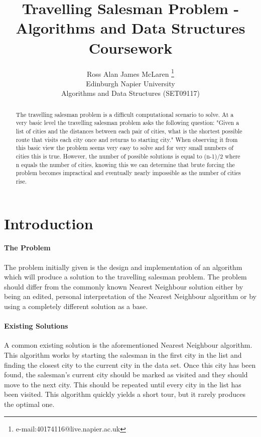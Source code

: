 \documentclass[conference,backref=page]{acmsiggraph}
\title{Travelling Salesman Problem - Algorithms and Data Structures Coursework}
\author{Ross Alan James McLaren \thanks{e-mail:40174116@live.napier.ac.uk} \\
Edinburgh Napier University\\
Algorithms and Data Structures (SET09117)}
\begin{document}
\maketitle

\raggedbottom

\begin{abstract}

The travelling salesman problem is a difficult computational scenario to solve. At a very basic level the travelling salesman problem asks the following question: "Given a list of cities and the distances between each pair of cities, what is the shortest possible route that visits each city once and returns to starting city." When observing it from this basic view the problem seems very easy to solve and for very small numbers of cities this is true. However, the number of possible solutions is equal to (n-1)/2 where n equals the number of cities, knowing this we 
can determine that brute forcing the problem becomes impractical and eventually nearly impossible as the number of cities rise.

\end{abstract}



\keywordlist





\section{Introduction}


\paragraph{The Problem}
The problem initially given is the design and implementation of an algorithm which will produce a solution to the travelling salesman problem. The problem should differ from the commonly known Nearest Neighbour solution either by being an edited, personal interpretation of the Nearest Neighbour algorithm or by using a completely different solution as a base.


\paragraph{Existing Solutions}
A common existing solution is the aforementioned Nearest Neighbour algorithm. This algorithm works by starting the salesman in the first city in the list and finding the closest city to the current city in the data set. Once this city has been found, the salesman's current city should be marked as visited and they should move to the next city. This should be repeated until every city in the list has been visited. This algorithm quickly yields a short tour, but it rarely produces the optimal one.
 
\end{document}
